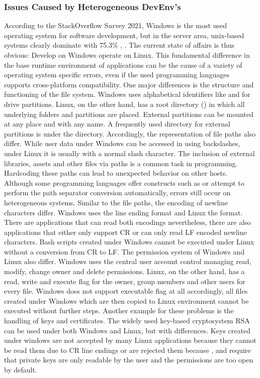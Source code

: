 \documentclass[12pt, a4paper]{article}
\begin{document}
        \subsubsection{Issues Caused by Heterogeneous \acs{DevEnv}'s}\label{sss::hetero}
        According to the StackOverflow Survey 2021, Windows is the most used operating system for software development, but in the server area, unix-based systems clearly dominate with 75.3\% \cite{stackoverflow2021}, \cite{unixusage}. The current state of affairs is thus obvious: Develop on Windows operate on Linux. This fundamental difference in the base runtime environment of applications can be the cause of a variety of operating system specific errors, even if the used programming languages supports cross-platform compatibility. One major differences is the structure and functioning of the file system. Windows uses alphabetical identifiers like  and  for drive partitions. Linux, on the other hand, has a root directory (\code{/}) in which all underlying folders and partitions are placed. External partitions can be mounted at any place and with any name. A frequently used directory for external partitions is under the  directory. Accordingly, the representation of file paths also differ. While user data under Windows can be accessed in  using backslashes, under Linux it is usually  with a normal slash character. The inclusion of external libraries, assets and other files via paths is a common task in programming. Hardcoding these paths can lead to unexpected behavior on other hosts. Although some programming languages offer constructs such as  or attempt to perform the path separator conversion automatically, errors still occur on heterogeneous systems.\newline
        Similar to the file paths, the encoding of newline characters differ. Windows uses the  line ending format and Linux the  format. There are applications that can read both encodings nevertheless, there are also applications that either only support CR or can only read LF encoded newline characters. Bash scripts created under Windows cannot be executed under Linux without a conversion from CR to LF. The permission system of Windows and Linux also differ. Windows uses the central user account control managing read, modify, change owner and delete permissions. Linux, on the other hand, has a read, write and execute flag for the owner, group members and other users for every file. Windows does not support executable flag at all accordingly, all files created under Windows which are then copied to Linux environment cannot be executed without further steps. Another example for these problems is the handling of keys and certificates. The widely used key-based cryptosystem \ac{RSA} can be used under both Windows and Linux, but with differences. Keys created under windows are not accepted by many Linux applications because they cannot be read them due to CR line endings or are rejected them because ,  and  require that private keys are only readable by the user and the permissions are too open by default.\newline
\end{document}
